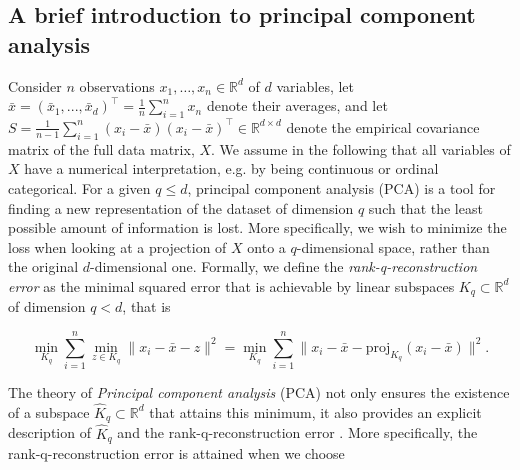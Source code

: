 \documentclass[a4paper,14pt]{article}
\newcommand{\RR}{\mathbb{R}}
\begin{document}
\subsection*{A brief introduction to principal component analysis}
\label{sec:introPCA}
Consider $n$ observations $x_1,\dotsc,x_n \in \RR^d$ of $d$ variables, let $\bar{x} = {(\bar{x}_1, ..., \bar{x}_d)}^\top = \frac{1}{n} \sum_{i=1}^n x_n$ denote their averages, and let $S = \frac{1}{n-1} \sum_{i=1}^n (x_i-\bar{x}) {(x_i-\bar{x})}^\top \in \RR^{d \times d}$ denote the empirical covariance matrix of the full data matrix, $X$. We assume in the following that all variables of $X$ have a numerical interpretation, e.g. by being continuous or ordinal categorical. For a given $q \leq d$, principal component analysis (PCA) is a tool for finding a new representation of the dataset of dimension $q$ such that the least possible amount of information is lost. More specifically, we wish to minimize the loss when looking at a projection of $X$ onto a $q$-dimensional space, rather than the original $d$-dimensional one. Formally, we define the \emph{rank-q-reconstruction error} as the minimal squared error that is achievable by linear subspaces $K_q \subset \RR^d$ of dimension $q < d$, that is

\begin{equation}
\min_{K_q} \sum_{i=1}^n \min_{z \in K_q} \lVert x_i - \bar{x} - z \rVert^2 =
\min_{K_q} \sum_{i=1}^n \lVert x_i - \bar{x} - \text{proj}_{K_q}(x_i - \bar{x}) \rVert^2.
\end{equation}

The theory of \emph{Principal component analysis} (PCA) not only ensures the existence of a subspace $\hat{K}_q \subset \RR^d$ that attains this minimum, it also provides an explicit description of $\hat{K}_q$ and the rank-q-reconstruction error \cite{HastieEtAl2009}. More specifically, the rank-q-reconstruction error is attained when we choose
\end{document}
